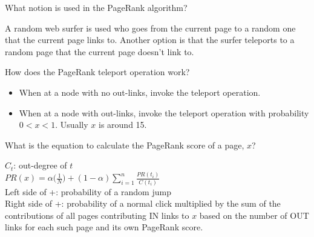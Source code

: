 \documentclass[2by4,grid]{flashcards}
\begin{document}
\begin{flashcard}{What notion is used in the PageRank algorithm?}
	\begin{center}
        A random web surfer is used who goes from the current page to a random one that the current page links to. Another option is that the surfer teleports to a random page that the current page doesn't link to.
	\end{center}
\end{flashcard}

\begin{flashcard}{How does the PageRank teleport operation work?}
	\begin{center}
        \begin{itemize}
            \item When at a node with no out-links, invoke the teleport operation.
            \item When at a node with out-links, invoke the teleport operation with probability $0 < x < 1$. Usually $x$ is around 15.
        \end{itemize}
	\end{center}
\end{flashcard}

\begin{flashcard}{What is the equation to calculate the PageRank score of a page, $x$?}
	\begin{center}
        $C_t$: out-degree of $t$ \\ \vspace{.4cm}
        $PR(x) = \alpha \bigg(\frac{1}{N}\bigg)+(1 − \alpha ) \sum\limits_{i=1}^n \frac{PR(t_i)}{C(t_i)}$ \\ \vspace{.4cm}
        Left side of +: probability of a random jump \\
        Right side of +: probability of a normal click multiplied by the sum of the contributions of all pages contributing IN links to $x$ based on the number of OUT links for each such page and its own PageRank score.
	\end{center}
\end{flashcard}
\end{document}
